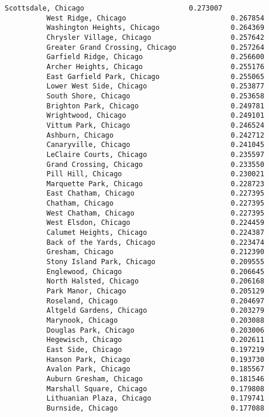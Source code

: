 \documentclass[11pt]{article}
\begin{document}
\begin{Verbatim}[commandchars=\\\{\}]
          Scottsdale, Chicago                         0.273007
          West Ridge, Chicago                         0.267854
          Washington Heights, Chicago                 0.264369
          Chrysler Village, Chicago                   0.257642
          Greater Grand Crossing, Chicago             0.257264
          Garfield Ridge, Chicago                     0.256600
          Archer Heights, Chicago                     0.255176
          East Garfield Park, Chicago                 0.255065
          Lower West Side, Chicago                    0.253877
          South Shore, Chicago                        0.253658
          Brighton Park, Chicago                      0.249781
          Wrightwood, Chicago                         0.249101
          Vittum Park, Chicago                        0.246524
          Ashburn, Chicago                            0.242712
          Canaryville, Chicago                        0.241045
          LeClaire Courts, Chicago                    0.235597
          Grand Crossing, Chicago                     0.233550
          Pill Hill, Chicago                          0.230021
          Marquette Park, Chicago                     0.228723
          East Chatham, Chicago                       0.227395
          Chatham, Chicago                            0.227395
          West Chatham, Chicago                       0.227395
          West Elsdon, Chicago                        0.224459
          Calumet Heights, Chicago                    0.224387
          Back of the Yards, Chicago                  0.223474
          Gresham, Chicago                            0.212390
          Stony Island Park, Chicago                  0.209555
          Englewood, Chicago                          0.206645
          North Halsted, Chicago                      0.206168
          Park Manor, Chicago                         0.205129
          Roseland, Chicago                           0.204697
          Altgeld Gardens, Chicago                    0.203279
          Marynook, Chicago                           0.203088
          Douglas Park, Chicago                       0.203006
          Hegewisch, Chicago                          0.202611
          East Side, Chicago                          0.197219
          Hanson Park, Chicago                        0.193730
          Avalon Park, Chicago                        0.185567
          Auburn Gresham, Chicago                     0.181546
          Marshall Square, Chicago                    0.179808
          Lithuanian Plaza, Chicago                   0.179741
          Burnside, Chicago                           0.177088

\end{Verbatim}
\end{document}
